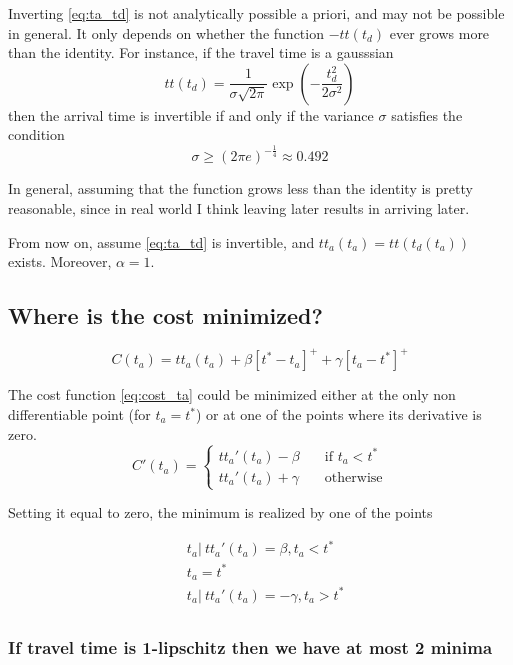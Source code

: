 \documentclass{article}
\begin{document}
Inverting \eqref{eq:ta_td} is not analytically possible a priori, and may not be possible in general.
It only depends on whether the function \(-tt(t_d)\) ever grows more than the identity.
For instance, if the travel time is a gausssian
\begin{equation*}
  tt(t_d) = \frac{1}{\sigma\sqrt{2\pi}}\exp\left(-{\frac{t_d^2}{2\sigma^2}}\right)
\end{equation*}
then the arrival time is invertible if and only if the variance \(\sigma\) satisfies the condition
\[\sigma \geq (2\pi e)^{-\frac{1}{4}} \approx 0.492 \]

In general, assuming that the function grows less than the identity is pretty reasonable,
since in real world I think leaving later results in arriving later.

From now on, assume \eqref{eq:ta_td} is invertible, and \(tt_a(t_a) = tt(t_d(t_a))\) exists.
Moreover, \(\alpha = 1\).

\subsection{Where is the cost minimized?}

\begin{equation}
  \label{eq:cost_ta}
  C(t_a) = tt_a(t_a) + \beta[t^*-t_a]^+ + \gamma[t_a-t^*]^+
\end{equation}

The cost function \eqref{eq:cost_ta} could be minimized either at the only non differentiable point (for \(t_a = t^*\))
or at one of the points where its derivative is zero.
\begin{equation}
  \label{eq:cost_diff}
  C'(t_a) =
  \begin{cases}
    tt_a'(t_a) -\beta \quad &\text{if } t_a < t^* \\
    tt_a'(t_a) + \gamma \quad &\text{otherwise}
  \end{cases}
\end{equation}

Setting it equal to zero, the minimum is realized by one of the points

\begin{align*}
  & t_a |\ tt_a'(t_a) = \beta, t_a < t^* \\
  & t_a = t^* \\
  & t_a |\ tt_a'(t_a) = -\gamma, t_a > t^* \\
\end{align*}

\subsubsection{If travel time is 1-lipschitz then we have at most 2 minima}
\end{document}
